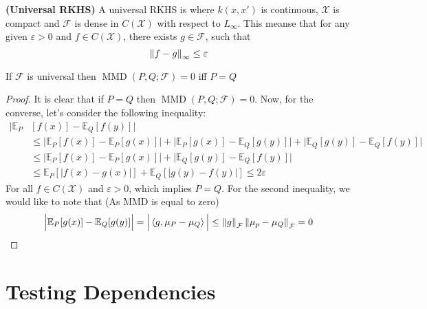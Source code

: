 \begin{definition}{\textbf{(Universal RKHS)}}
    A universal RKHS is where $k(x, x')$ is continuous, $\mathcal{X}$ is compact and $\mathcal{F}$ is dense in $C(\mathcal{X})$ with respect to $L_\infty$. This meanse that for any given $\varepsilon > 0$ and $f\in C(\mathcal{X})$, there exists $g\in\mathcal{F}$, such that
    \begin{equation*}
        \left\lVert f-g\right\rVert_\infty \le \varepsilon
    \end{equation*}
\end{definition}

\begin{theorem}
    If $\mathcal{F}$ is universal then $\operatorname{MMD}(P, Q;\mathcal{F}) = 0$ iff $P = Q$
\end{theorem}
\begin{proof}
    It is clear that if $P=Q$ then $\operatorname{MMD}(P, Q;\mathcal{F}) = 0$. Now, for the converse, let's consider the following inequality:
    \begin{equation*}
    \begin{aligned}
        \Big|\mathbb{E}_P&[f(x)] - \mathbb{E}_Q[f(y)] \Big|  \\
        &\le\Big| \mathbb{E}_P[f(x)] - \mathbb{E}_P[g(x)] \Big| + \Big| \mathbb{E}_P[g(x)] - \mathbb{E}_Q[g(y)] \Big| + \Big| \mathbb{E}_Q[g(y)] - \mathbb{E}_Q[f(y)] \Big| \\
        &\le\Big| \mathbb{E}_P[f(x)] - \mathbb{E}_P[g(x)] \Big| + \Big| \mathbb{E}_Q[g(y)] - \mathbb{E}_Q[f(y)] \Big| \\
        &\le\mathbb{E}_P[|f(x) - g(x)|] + \mathbb{E}_Q[|g(y) - f(y)|] \le 2\varepsilon
    \end{aligned}
    \end{equation*}
    For all $f\in C(\mathcal{X})$ and $\varepsilon>0$, which implies $P=Q$. For the second inequality, we would like to note that (As MMD is equal to zero)
    \begin{equation*}
    \begin{aligned}
        \Big| \mathbb{E}_P[g(x)] - \mathbb{E}_Q[g(y)] \Big|  = \Big| \left\langle g, \mu_P-\mu_Q \right\rangle \Big| \le \left\lVert g\right\rVert_\mathcal{F}\left\lVert\mu_p-\mu_Q\right\rVert_\mathcal{F} = 0
    \end{aligned}
    \end{equation*}
\end{proof}

\section{Testing Dependencies}

